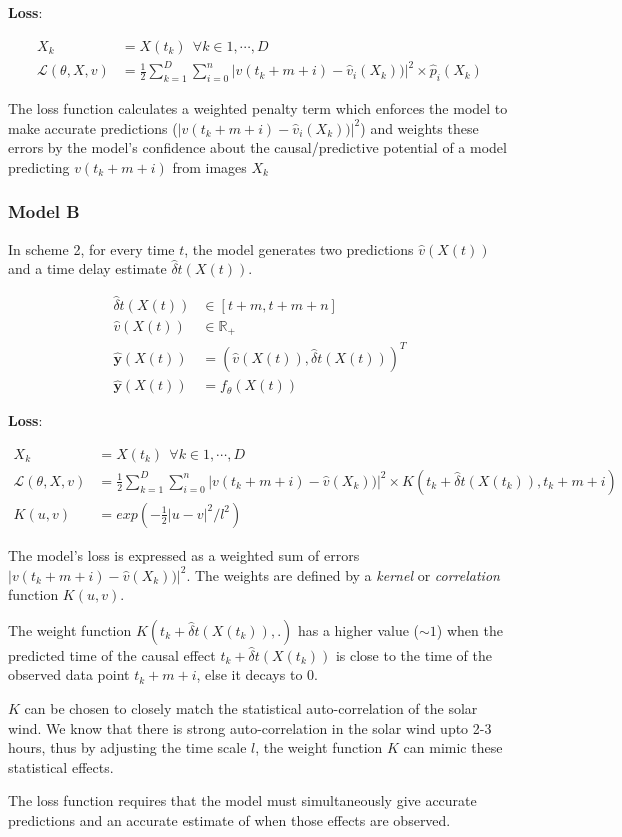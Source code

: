 \documentclass[]{article}
\theoremstyle{definition}
\begin{document}
\textbf{Loss}: 

\begin{align*}
    X_{k}                     & = { X(t_{k}) } \ \ \forall k \in {1, \cdots, D} \\
    \mathcal{L}(\theta, X, v) & = \frac{1}{2} \sum_{k = 1}^{D}{\sum_{i = 0}^{n}{|v(t_{k}+m+i) - \hat{v}_{i}(X_k))|^{2} \times \hat{p}_{i}(X_{k})}}
\end{align*}

The loss function calculates a weighted penalty term which enforces the model to make accurate predictions ($|v(t_{k}+m+i) - \hat{v}_{i}(X_k))|^{2}$) and weights these errors by the model's confidence about the causal/predictive potential of a model predicting $v(t_{k}+m+i)$ from images $X_k$

\subsubsection*{Model B}

In scheme 2, for every time $t$, the model generates two predictions $\hat{v}(X(t))$ and a time delay estimate $\hat{\delta}t(X(t))$.

\begin{align*}
    \hat{\delta}t(X(t))    & \in [t+m, t+m+n] \\ 
    \hat{v}(X(t))          & \in \mathbb{R}_{+}\\
    \mathbf{\hat{y}}(X(t)) & =   (\hat{v}(X(t)), \hat{\delta}t(X(t)))^T\\
    \mathbf{\hat{y}}(X(t)) & =   f_{\theta}(X(t))
\end{align*}

\textbf{Loss}:

\begin{align*}
    X_{k}                     & = { X(t_{k}) } \ \ \forall k \in {1, \cdots, D} \\
    \mathcal{L}(\theta, X, v) & = \frac{1}{2} \sum_{k = 1}^{D}{\sum_{i = 0}^{n}{|v(t_{k}+m+i) - \hat{v}(X_k))|^{2} \times K(t_{k} + \hat{\delta}t(X(t_k)), t_{k}+m+i) }} \\
    K(u, v)                   & = exp(-\frac{1}{2}|u-v|^{2}/l^2) 
\end{align*}


The model's loss is expressed as a weighted sum of errors $|v(t_{k}+m+i) - \hat{v}(X_k))|^{2}$. The weights are defined by a \emph{kernel} or \emph{correlation} function $K(u, v)$. 

The weight function $K(t_{k} + \hat{\delta}t(X(t_k)),.)$ has a higher value ($\sim 1$) when the predicted time of the causal effect $t_{k} + \hat{\delta}t(X(t_k))$ is close to the time of the observed data point $t_{k}+m+i$, else it decays to $0$.

$K$ can be chosen to closely match the statistical auto-correlation of the solar wind. We know that there is strong auto-correlation in the solar wind upto 2-3 hours, thus by adjusting the time scale $l$, the weight function $K$ can mimic these statistical effects.

The loss function requires that the model must simultaneously give accurate predictions and an accurate estimate of when those effects are observed. 
\end{document}
